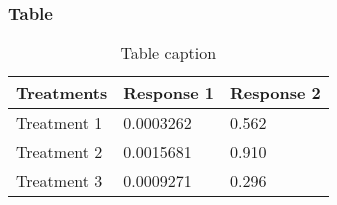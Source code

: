 \documentclass{beamer}
\begin{document}
\begin{frame}
\frametitle{Table}
\begin{table}
\begin{tabular}{l l l}
\toprule
\textbf{Treatments} & \textbf{Response 1} & \textbf{Response 2}\\
\midrule
Treatment 1 & 0.0003262 & 0.562 \\
Treatment 2 & 0.0015681 & 0.910 \\
Treatment 3 & 0.0009271 & 0.296 \\
\bottomrule
\end{tabular}
\caption{Table caption}
\end{table}
\end{frame}

\end{document}
